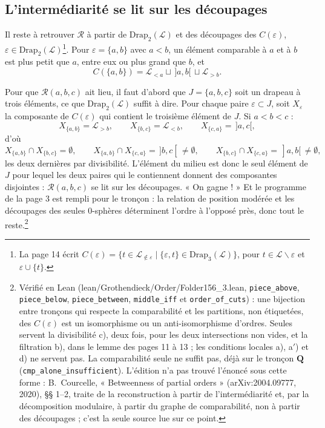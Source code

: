 \documentclass[11pt,a4paper]{article}
\begin{document}
\subsection*{L'intermédiarité se lit sur les découpages}

Il reste à retrouver $\mathcal{R}$ à partir de $\mathrm{Drap}_{2}(\mathcal{L})$
et des découpages des $C(\varepsilon)$, $\varepsilon \in
\mathrm{Drap}_{2}(\mathcal{L})$\footnote{La page 14 écrit $C(\varepsilon) = \{t
\in \mathcal{L}_{\notin \varepsilon} \mid \{\varepsilon, t\} \in
\mathrm{Drap}_{3}(\mathcal{L})\}$, pour $t \in \mathcal{L} \smallsetminus
\varepsilon$ et $\varepsilon \cup \{t\}$.}. Pour $\varepsilon = \{a,b\}$ avec
$a < b$, un élément comparable à $a$ et à $b$ est plus petit que $a$, entre
eux ou plus grand que $b$, et
\[
C(\{a,b\}) = \mathcal{L}_{<a} \sqcup \,]a,b[\, \sqcup \mathcal{L}_{>b}.
\]

Pour que $\mathcal{R}(a,b,c)$ ait lieu, il faut d'abord que $J = \{a,b,c\}$ soit
un drapeau à trois éléments, ce que $\mathrm{Drap}_{2}(\mathcal{L})$ suffit à
dire. Pour chaque paire $\varepsilon \subset J$, soit $X_{\varepsilon}$ la
composante de $C(\varepsilon)$ qui contient le troisième élément de $J$. Si
$a < b < c$ :
\[
X_{\{a,b\}} = \mathcal{L}_{>b}, \qquad X_{\{b,c\}} = \mathcal{L}_{<b}, \qquad
X_{\{c,a\}} = \,]a,c[,
\]
d'où
\[
X_{\{a,b\}} \cap X_{\{b,c\}} = \emptyset, \qquad X_{\{a,b\}} \cap X_{\{c,a\}} =
\,]b,c[\, \neq \emptyset, \qquad X_{\{b,c\}} \cap X_{\{c,a\}} = \,]a,b[\, \neq
\emptyset,
\]
les deux dernières par divisibilité. L'élément du milieu est donc le seul
élément de $J$ pour lequel les deux paires qui le contiennent donnent des
composantes disjointes : $\mathcal{R}(a,b,c)$ se lit sur les découpages. « On
gagne ! » Et le programme de la page 3 est rempli pour le tronçon : la relation
de position modérée et les découpages des seules 0-sphères déterminent
l'ordre à l'opposé près, donc tout le reste.\footnote{Vérifié en Lean
(lean/Grothendieck/Order/Folder156\_3.lean, \texttt{piece\_above},
\texttt{piece\_below}, \texttt{piece\_between}, \texttt{middle\_iff} et
\texttt{order\_of\_cuts}) : une bijection entre tronçons qui respecte la
comparabilité et les partitions, non étiquetées, des $C(\varepsilon)$ est un
isomorphisme ou un anti-isomorphisme d'ordres. Seules servent la divisibilité
c), deux fois, pour les deux intersections non vides, et la filtration b), dans
le lemme des pages 11 à 13 ; les conditions locales a), a$'$) et d) ne servent
pas. La comparabilité seule ne suffit pas, déjà sur le tronçon $\mathbf{Q}$
(\texttt{cmp\_alone\_insufficient}). L'édition n'a pas trouvé l'énoncé sous
cette forme : B.~Courcelle, « Betweenness of partial orders »
(arXiv:2004.09777, 2020), §§ 1--2, traite de la reconstruction à partir de
l'intermédiarité et, par la décomposition modulaire, à partir du graphe de
comparabilité, non à partir des découpages ; c'est la seule source lue sur ce
point.}
\end{document}
